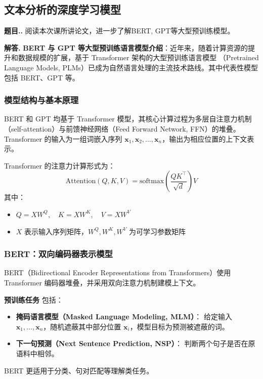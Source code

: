\documentclass[12pt, a4paper, oneside]{ctexart}
\numberwithin{equation}{section}  %
\newcounter{problem}[subsection]  %
\newenvironment{problem}[1][]{\stepcounter{problem}\par\noindent\textbf{题目\thesubsection.\arabic{problem}. #1}}{\smallskip\par}
\newenvironment{solution}[1][]{\par\noindent\textbf{#1解答. }}{\smallskip\par}  %
\begin{document}
\subsection{文本分析的深度学习模型}
\begin{problem}
阅读本次课所讲论文，进一步了解BERT, GPT等大型预训练模型。
\end{problem}
\begin{solution}
\textbf{BERT 与 GPT 等大型预训练语言模型介绍}：近年来，随着计算资源的提升和数据规模的扩展，基于 Transformer 架构的大型预训练语言模型
（Pretrained Language Models, PLMs）已成为自然语言处理的主流技术路线。其中代表性模型包括 BERT、GPT 等。
\subsubsection*{模型结构与基本原理}
BERT 和 GPT 均基于 Transformer 模型，其核心计算过程为多层自注意力机制（self-attention）与前馈神经网络（Feed Forward Network, FFN）的堆叠。Transformer 的输入为一组词嵌入序列 $\boldsymbol{x}_1, \boldsymbol{x}_2, \dots, \boldsymbol{x}_n$，输出为相应位置的上下文表示。

Transformer 的注意力计算形式为：
\[
\text{Attention}(Q, K, V) = \text{softmax} \left( \frac{Q K^\top}{\sqrt{d}} \right) V
\]
其中：
\begin{itemize}
  \item $Q = X W^Q,\quad K = X W^K,\quad V = X W^V$
  \item $X$ 表示输入序列矩阵，$W^Q, W^K, W^V$ 为可学习参数矩阵
\end{itemize}

\subsubsection*{BERT：双向编码器表示模型}
BERT（Bidirectional Encoder Representations from Transformers）使用 Transformer 编码器堆叠，并采用双向注意力机制建模上下文。

\textbf{预训练任务} 包括：
\begin{itemize}
  \item \textbf{掩码语言模型（Masked Language Modeling, MLM）}：
  给定输入 $\boldsymbol{x}_1, \dots, \boldsymbol{x}_n$，随机遮蔽其中部分位置 $\boldsymbol{x}_i$，模型目标为预测被遮蔽的词。
  \item \textbf{下一句预测（Next Sentence Prediction, NSP）}：
  判断两个句子是否在原语料中相邻。
\end{itemize}

BERT 更适用于分类、句对匹配等理解类任务。


\end{solution}
\end{document}
